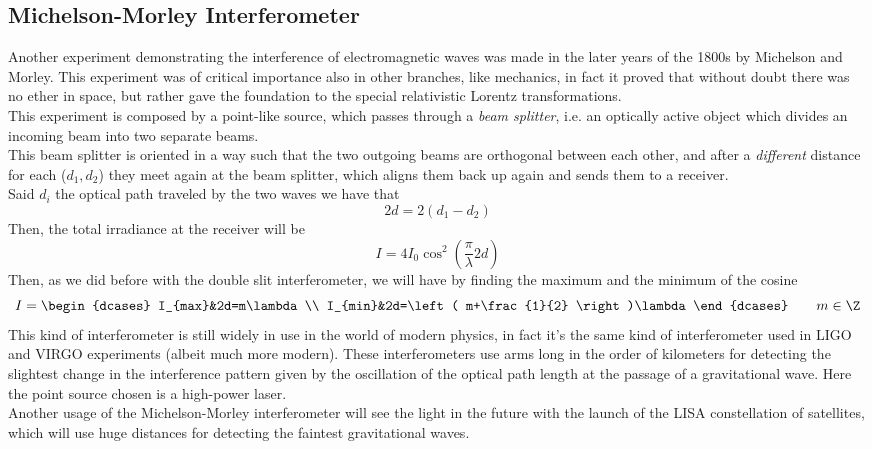 \documentclass[../electromagnetism.tex]{subfiles}
\begin{document}
\subsection{Michelson-Morley Interferometer}
Another experiment demonstrating the interference of electromagnetic waves was made in the later years of the 1800s by Michelson and Morley. This experiment was of critical importance also in other branches, like mechanics, in fact it proved that without doubt there was no ether in space, but rather gave the foundation to the special relativistic Lorentz transformations.\\
This experiment is composed by a point-like source, which passes through a \textit{beam splitter}, i.e. an optically active object which divides an incoming beam into two separate beams.\\
This beam splitter is oriented in a way such that the two outgoing beams are orthogonal between each other, and after a \textit{different} distance for each ($d_1, d_2$) they meet again at the beam splitter, which aligns them back up again and sends them to a receiver.\\
Said $d_i$ the optical path traveled by the two waves we have that
\begin{equation*}
	2d=2(d_1-d_2)
\end{equation*}
Then, the total irradiance at the receiver will be
\begin{equation}
	I=4I_0\cos^2\left( \frac{\pi}{\lambda}2d \right)
	\label{eq:michelsoninttot.mint}
\end{equation}
Then, as we did before with the double slit interferometer, we will have by finding the maximum and the minimum of the cosine
\begin{equation}
	I=\begin{dcases}
		I_{max}&2d=m\lambda\\
		I_{min}&2d=\left( m+\frac{1}{2} \right)\lambda
	\end{dcases}\qquad m\in\Z
	\label{eq:michelsonmaxint.mint}
\end{equation}
This kind of interferometer is still widely in use in the world of modern physics, in fact it's the same kind of interferometer used in LIGO and VIRGO experiments (albeit much more modern). These interferometers use arms long in the order of kilometers for detecting the slightest change in the interference pattern given by the oscillation of the optical path length at the passage of a gravitational wave. Here the point source chosen is a high-power laser.\\
Another usage of the Michelson-Morley interferometer will see the light in the future with the launch of the LISA constellation of satellites, which will use huge distances for detecting the faintest gravitational waves.
\end{document}

